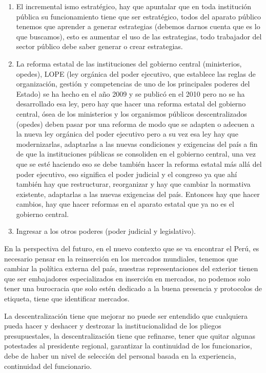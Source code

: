 \documentclass[
  letterpaper,
  DIV=11,
  numbers=noendperiod]{scrartcl}
\providecommand{\tightlist}{%
  \setlength{\itemsep}{0pt}\setlength{\parskip}{0pt}}\usepackage{longtable,booktabs,array}
\begin{document}
\begin{enumerate}
\def\labelenumi{\arabic{enumi}.}
\tightlist
\item
  El incremental ismo estratégico, hay que apuntalar que en toda
  institución pública su funcionamiento tiene que ser estratégico, todos
  del aparato público tenemos que aprender a generar estrategias
  (debemos darnos cuenta que es lo que buscamos), esto es aumentar el
  uso de las estrategias, todo trabajador del sector público debe saber
  generar o crear estrategias.
\item
  La reforma estatal de las instituciones del gobierno central
  (ministerios, opedes), LOPE (ley orgánica del poder ejecutivo, que
  establece las reglas de organización, gestión y competencias de uno de
  los principales poderes del Estado) se ha hecho en el año 2009 y se
  publicó en el 2010 pero no se ha desarrollado esa ley, pero hay que
  hacer una reforma estatal del gobierno central, ósea de los
  ministerios y los organismos públicos descentralizados (opedes) deben
  pasar por una reforma de modo que se adapten o adecuen a la nueva ley
  orgánica del poder ejecutivo pero a su vez esa ley hay que
  modernizarlas, adaptarlas a las nuevas condiciones y exigencias del
  país a fin de que la instituciones públicas se consoliden en el
  gobierno central, una vez que se esté haciendo eso se debe también
  hacer la reforma estatal más allá del poder ejecutivo, eso significa
  el poder judicial y el congreso ya que ahí también hay que
  restructurar, reorganizar y hay que cambiar la normativa existente,
  adaptarlas a las nuevas exigencias del país. Entonces hay que hacer
  cambios, hay que hacer reformas en el aparato estatal que ya no es el
  gobierno central.
\item
  Ingresar a los otros poderes (poder judicial y legislativo).
\end{enumerate}

En la perspectiva del futuro, en el nuevo contexto que se va encontrar
el Perú, es necesario pensar en la reinserción en los mercados
mundiales, tenemos que cambiar la política externa del país, nuestras
representaciones del exterior tienen que ser embajadores especializados
en inserción en mercados, no podemos solo tener una burocracia que solo
estén dedicado a la buena presencia y protocolos de etiqueta, tiene que
identificar mercados.

La descentralización tiene que mejorar no puede ser entendido que
cualquiera pueda hacer y deshacer y destrozar la institucionalidad de
los pliegos presupuestales, la descentralización tiene que refinarse,
tener que quitar algunas potestades al presidente regional, garantizar
la continuidad de los funcionarios, debe de haber un nivel de selección
del personal basada en la experiencia, continuidad del funcionario.
\end{document}
